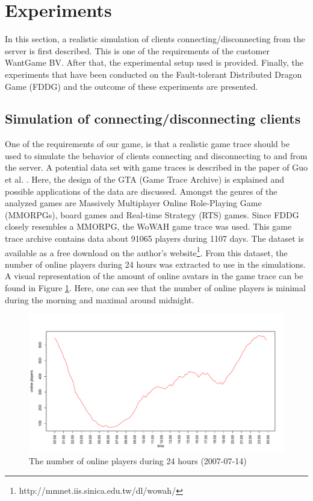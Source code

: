 \section{Experiments}
\label{sec:experiments}
	In this section, a realistic simulation of clients connecting/disconnecting from the server is first described. This is one of the requirements of the customer WantGame BV. After that, the experimental setup used is provided. Finally, the experiments that have been conducted on the Fault-tolerant Distributed Dragon Game (FDDG) and the outcome of these experiments are presented.
	
\subsection{Simulation of connecting/disconnecting clients}
\label{subsec:simulation_clients}
One of the requirements of our game, is that a realistic game trace should be used to simulate the behavior of clients connecting and disconnecting to and from the server.
A potential data set with game traces is described in the paper of Guo et al. \cite{guo2012game}.
Here, the design of the GTA (Game Trace Archive) is explained and possible applications of the data are discussed.
Amongst the genres of the analyzed games are Massively Multiplayer Online Role-Playing Game (MMORPGs), board games and Real-time Strategy (RTS) games. 
Since FDDG closely resembles a MMORPG, the WoWAH game trace \cite{lee2011world} was used.
This game trace archive contains data about 91065 players during 1107 days. The dataset is available as a free download on the author's website\footnote{http://mmnet.iis.sinica.edu.tw/dl/wowah/}.
From this dataset, the number of online players during 24 hours was extracted to use in the simulations. 
A visual representation of the amount of online avatars in the game trace can be found in Figure \ref{fig:online_players_plot}. Here, one can see that the number of online players is minimal during the morning and maximal around midnight.

\begin{figure}[h!]
  \centering
    \includegraphics[width=\textwidth]{images/online_players_plot}
    
  \caption{The number of online players during 24 hours (2007-07-14)}
  \label{fig:online_players_plot}
\end{figure}


